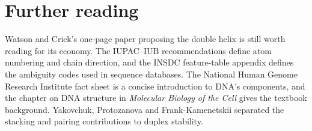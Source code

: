 \section*{Further reading}
Watson and Crick's one-page paper proposing the double helix is still worth
reading for its economy.\cite{WatsonCrick1953} The IUPAC--IUB recommendations
define atom numbering and chain direction,\cite{IUPAC1983,IUPAC1970} and the
INSDC feature-table appendix defines the ambiguity codes used in sequence
databases.\cite{INSDC} The National Human Genome Research Institute fact sheet is
a concise introduction to DNA's components,\cite{NHGRIDNA} and the chapter on
DNA structure in \emph{Molecular Biology of the Cell} gives the textbook
background.\cite{Alberts2002} Yakovchuk, Protozanova and Frank-Kamenetskii
separated the stacking and pairing contributions to duplex
stability.\cite{Yakovchuk2006}
